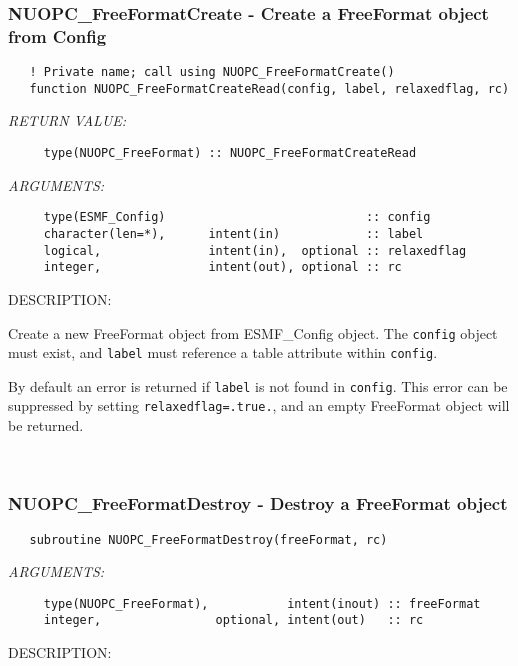 \subsubsection [NUOPC\_FreeFormatCreate] {NUOPC\_FreeFormatCreate - Create a FreeFormat object from Config}


\begin{verbatim}   ! Private name; call using NUOPC_FreeFormatCreate()
   function NUOPC_FreeFormatCreateRead(config, label, relaxedflag, rc)\end{verbatim}{\em RETURN VALUE:}
\begin{verbatim}     type(NUOPC_FreeFormat) :: NUOPC_FreeFormatCreateRead\end{verbatim}{\em ARGUMENTS:}
\begin{verbatim}     type(ESMF_Config)                            :: config
     character(len=*),      intent(in)            :: label
     logical,               intent(in),  optional :: relaxedflag
     integer,               intent(out), optional :: rc \end{verbatim}
{\sf DESCRIPTION:\\ }


     Create a new FreeFormat object from ESMF\_Config object. The {\tt config}
     object must exist, and {\tt label} must reference a table attribute 
     within {\tt config}.
  
   By default an error is returned if {\tt label} is not found in {\tt config}.
   This error can be suppressed by setting {\tt relaxedflag=.true.}, and an 
   empty FreeFormat object will be returned.
  
 
\mbox{}\hrulefill\ 
 
\subsubsection [NUOPC\_FreeFormatDestroy] {NUOPC\_FreeFormatDestroy - Destroy a FreeFormat object}


\begin{verbatim}   subroutine NUOPC_FreeFormatDestroy(freeFormat, rc)\end{verbatim}{\em ARGUMENTS:}
\begin{verbatim}     type(NUOPC_FreeFormat),           intent(inout) :: freeFormat
     integer,                optional, intent(out)   :: rc\end{verbatim}
{\sf DESCRIPTION:\\ }


